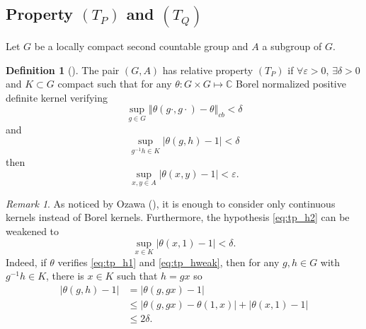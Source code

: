 \documentclass{article}
\theoremstyle{definition}
\newtheorem{definition}[theorem]{Definition}
\theoremstyle{remark}
\newtheorem{remark}[theorem]{Remark}
\numberwithin{equation}{section}
\newcommand{\C}{\mathbb{C}}
\begin{document}
\subsection{Property \texorpdfstring{$(T_P)$}{(Tp)} and \texorpdfstring{$(T_Q)$}{(Tq)}}
Let $G$ be a locally compact second countable group and $A$ a subgroup of $G$.
\begin{definition}[\cite{Ozawa+2011+89+104}]
    The pair $(G,A)$ has relative property $(T_P)$ if $\forall \varepsilon>0$, $\exists\delta >0$ and $K\subset G$ compact such that for any $\theta:G\times G\mapsto \C$ Borel normalized positive definite kernel verifying \begin{equation}
        \label{eq:tp_h1} \underset{g\in G}{\sup} \left\Vert \theta(g\cdot,g\cdot)-\theta \right\Vert_{cb} < \delta
    \end{equation}and \begin{equation}
        \label{eq:tp_h2}\underset{g^{-1}h\in K}{\sup} \left\vert \theta(g,h)-1\right\vert < \delta
    \end{equation} 
    then \begin{equation}
        \label{eq:tp_c} \underset{x,y\in A}{\sup} \left\vert \theta(x,y)-1\right\vert < \varepsilon.
    \end{equation}
\end{definition}

\begin{remark}As noticed by Ozawa (\cite[Section 3]{Ozawa+2011+89+104}), it is enough to consider only continuous kernels instead of Borel kernels. Furthermore, the hypothesis \eqref{eq:tp_h2} can be weakened to \begin{equation}
        \label{eq:tp_hweak}
    \underset{x\in K}{\sup}\left\vert \theta(x,1)-1\right\vert < \delta.\end{equation}
    Indeed, if $\theta$ verifies \eqref{eq:tp_h1} and \eqref{eq:tp_hweak}, then for any $g,h\in G$ with $g^{-1}h\in K$, there is $x\in K$ such that $h=gx$ so \begin{align*}
        \left\vert \theta(g,h)-1\right\vert & =  \left\vert \theta(g,gx)-1\right\vert \\
         & \leq   \left\vert \theta(g,gx)-\theta(1,x)\right\vert +\left\vert \theta(x,1)-1\right\vert\\
         & \leq  2\delta.
    \end{align*}
\end{remark}
\end{document}
